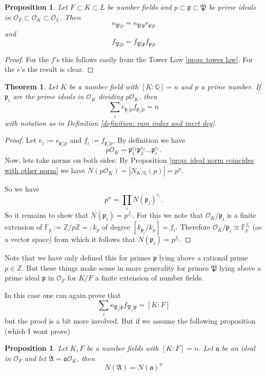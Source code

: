 \documentclass[11pt,a4paper]{report}
\theoremstyle{plain}
\newtheorem{theorem}[subsection]{Theorem}
\newtheorem{prop}[subsection]{Proposition}
\theoremstyle{definition}
\theoremstyle{definition}
\newcommand{\ZZ}{\mathbb{Z}}
\def\FF{\mathbb{F}}
\def\QQ{\mathbb{Q}}
\def \gothP{\mathfrak{P}}
\def\gothp{\mathfrak{p}}
\def \OO {\mathcal{O}}
\def\gotha{\mathfrak{a}}
\begin{document}
	\begin{prop}\label{prop: tow law for ram rel}
		Let $F \subset K \subset L$ be number fields and $p \subset \gothp \subset \gothP$ be prime ideals in $\OO_F \subset \OO_K \subset \OO_L$. Then
		\[e_{\gothP|p}=e_{\gothP|\gothp}e_{\gothp|p} \] and 	\[f_{\gothP|p}=f_{\gothP|\gothp}f_{\gothp|p} \]
	\end{prop}
	
	\begin{proof}
		For the $f$'s this follows easily from the Tower Law \ref{prop: tower law}. For the $e$'s the result is clear.
	\end{proof}
	
	\begin{theorem}\label{thm: ram-rel}
		Let $K$ be a number field with $[K:\QQ]=n$ and $p$ a prime number. If $\gothp_i$ are the prime ideals in $\OO_K$ dividing $p\OO_K$, then \[\sum_i e_{\gothp_i|p}f_{\gothp_i|p}=n\] with notation as in Definition \ref{definition: ram index and inert deg}.
	\end{theorem}
	
	\begin{proof}
		Let $e_i:=e_{\gothp_i|p}$ and $f_i:=f_{\gothp_i|p}$. By definition we have \[p\OO_K=\gothp_1^{e_1}\gothp_2^{e_2}\dots\gothp_r^{e_r}.\] Now, lets take norms on both sides: By Proposition \ref{prop: ideal norm coincides with other norm} we have $N(p\OO_K)=|N_{K/\QQ}(p)|=p^n$.
		
		So we have  \[p^n=\prod_i N(\gothp_i)^{e_i}.\] So it remains to show that $N(\gothp_i)=p^{f_i}$. For this we note that $\OO_K/\gothp_i$ is a finite extension of $\FF_p:=\ZZ/p\ZZ=:k_p$ of degree $[k_{\gothp_i}/k_p]=f_i$. Therefore $\OO_K/\gothp_i \cong \FF_p^{f_i}$ (as a vector space) from which it follows that  $N(\gothp_i)=p^{f_i}$. 
	\end{proof}
	
	
	
	
	
	
	Note that we have only defined this for primes $\gothp$ lying above a rational prime $p \in \ZZ$. But these things make sense in more generality for primes $\gothP$  lying above a prime ideal $\gothp$ in $\OO_F$ for $K/F$ a finite extension of number fields. 
	
	In this case one can again prove that \begin{equation} \label{eqn: ram rel} \sum_i e_{\gothP_i|\gothp}f_{\gothP_i|\gothp}=[K:F] \end{equation} but the proof is a bit more involved. But if we assume the following proposition (which I wont prove)	
	\begin{prop}\label{prop: ideal norm in tower}
		Let $K,F$ be a number fields with $[K:F]=n$. Let $\mathfrak{a}$ be an ideal in $\OO_F$ and let $\mathfrak{A}=\gotha\OO_K$, then 
		\[N(\mathfrak{A})=N(\gotha)^n\]
	\end{prop}
	
\end{document}
